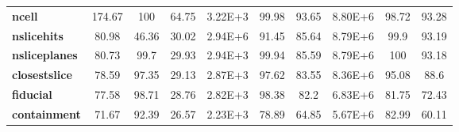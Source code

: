 \begin{table}[!hb]
\begin{tabular}{|l|ccc|ccc|ccc|}
\textbf{ncell}        & 174.67            & 100                                                                & 64.75                                     & 3.22E+3               & 99.98                                                               & 93.65                                      & 8.80E+6           & 98.72                                                               & 93.28                                      \\
\textbf{nslicehits}   & 80.98             & 46.36                                                              & 30.02                                     & 2.94E+6               & 91.45                                                               & 85.64                                      & 8.79E+6           & 99.9                                                                & 93.19                                      \\
\textbf{nsliceplanes} & 80.73             & 99.7                                                               & 29.93                                     & 2.94E+3               & 99.94                                                               & 85.59                                      & 8.79E+6           & 100                                                                 & 93.18                                      \\
\textbf{closestslice} & 78.59             & 97.35                                                              & 29.13                                     & 2.87E+3               & 97.62                                                               & 83.55                                      & 8.36E+6           & 95.08                                                               & 88.6                                       \\
\textbf{fiducial}     & 77.58             & 98.71                                                              & 28.76                                     & 2.82E+3               & 98.38                                                               & 82.2                                       & 6.83E+6           & 81.75                                                               & 72.43                                      \\
\textbf{containment}  & 71.67             & 92.39                                                              & 26.57                                     & 2.23E+3               & 78.89                                                               & 64.85                                      & 5.67E+6           & 82.99                                                               & 60.11                                      \\

\end{tabular}
\end{table}
